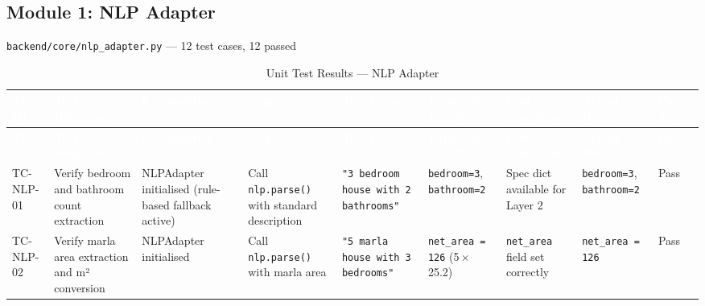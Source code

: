 \bigskip

\subsection{Module 1: NLP Adapter}
\texttt{backend/core/nlp\_adapter.py} — 12 test cases, 12 passed

\begin{landscape}
\small
\begin{longtable}{|p{1.4cm}|p{3.2cm}|p{3.0cm}|p{2.8cm}|p{2.8cm}|p{2.8cm}|p{2.6cm}|p{2.8cm}|p{1.0cm}|}
\caption{Unit Test Results — NLP Adapter} \label{tab:nlp} \\
\hline
\rowcolor{tableheader}
\textcolor{white}{\textbf{TC ID}} &
\textcolor{white}{\textbf{Test Objective}} &
\textcolor{white}{\textbf{Precondition}} &
\textcolor{white}{\textbf{Steps}} &
\textcolor{white}{\textbf{Test Data}} &
\textcolor{white}{\textbf{Expected Result}} &
\textcolor{white}{\textbf{Post-condition}} &
\textcolor{white}{\textbf{Actual Result}} &
\textcolor{white}{\textbf{Pass/ Fail}} \\
\hline
\endfirsthead
\hline
\rowcolor{tableheader}
\textcolor{white}{\textbf{TC ID}} &
\textcolor{white}{\textbf{Test Objective}} &
\textcolor{white}{\textbf{Precondition}} &
\textcolor{white}{\textbf{Steps}} &
\textcolor{white}{\textbf{Test Data}} &
\textcolor{white}{\textbf{Expected Result}} &
\textcolor{white}{\textbf{Post-condition}} &
\textcolor{white}{\textbf{Actual Result}} &
\textcolor{white}{\textbf{Pass/ Fail}} \\
\hline
\endhead

\rowcolor{passgreen}
TC-NLP-01 & Verify bedroom and bathroom count extraction & NLPAdapter initialised (rule-based fallback active) & Call \texttt{nlp.parse()} with standard description & \texttt{"3 bedroom house with 2 bathrooms"} & \texttt{bedroom=3}, \texttt{bathroom=2} & Spec dict available for Layer 2 & \texttt{bedroom=3}, \texttt{bathroom=2} & Pass \\ \hline

\rowcolor{passgreen}
TC-NLP-02 & Verify marla area extraction and m² conversion & NLPAdapter initialised & Call \texttt{nlp.parse()} with marla area & \texttt{"5 marla house with 3 bedrooms"} & \texttt{net\_area = 126} (5\,$\times$\,25.2) & \texttt{net\_area} field set correctly & \texttt{net\_area = 126} & Pass \\ \hline


\end{longtable}
\end{landscape}
